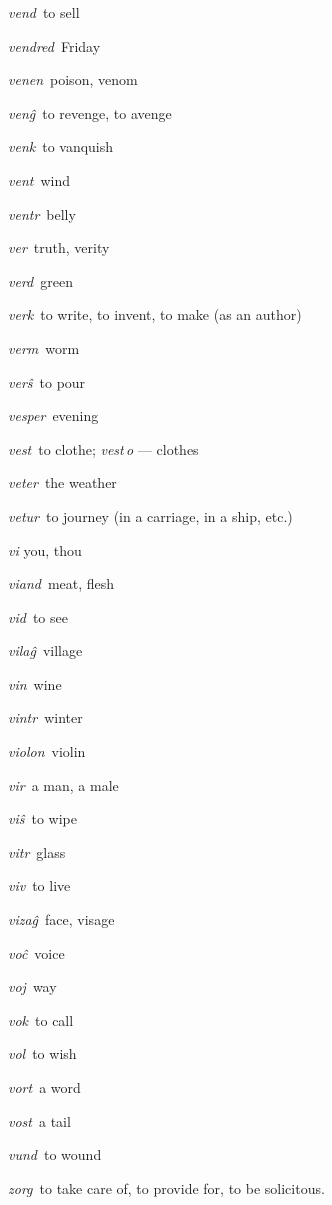 \begin{landscape}
\begin{multicols}{5}
\begin{outdent}{1em}
\emph{vend\,} to sell

\emph{vendred\,} Friday

\emph{venen\,} poison, venom

\emph{venĝ\,} to revenge, to avenge

\emph{venk\,} to vanquish

\emph{vent\,} wind

\emph{ventr\,} belly

\emph{ver\,} truth, verity

\emph{verd\,} green

\emph{verk\,} to write, to invent, to make (as an author)

\emph{verm\,} worm

\emph{verŝ\,} to pour

\emph{vesper\,} evening

\emph{vest\,} to clothe; \emph{vest\,o} — clothes

\emph{veter\,} the weather

\emph{vetur\,} to journey (in a carriage, in a ship, etc.)

\emph{vi} you, thou

\emph{viand\,} meat, flesh

\emph{vid\,} to see

\emph{vilaĝ\,} village

\emph{vin\,} wine

\emph{vintr\,} winter

\emph{violon\,} violin

\emph{vir\,} a man, a male

\emph{viŝ\,} to wipe

\emph{vitr\,} glass

\emph{viv\,} to live

\emph{vizaĝ\,} face, visage

\emph{voĉ\,} voice

\emph{voj\,} way

\emph{vok\,} to call

\emph{vol\,} to wish

\emph{vort\,} a word

\emph{vost\,} a tail

\emph{vund\,} to wound
\end{outdent}


\begin{outdent}{1em}
\emph{zorg\,} to take care of, to provide for, to be solicitous.
\end{outdent}


\end{multicols}
\end{landscape}
